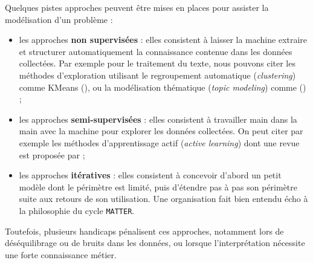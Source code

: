 			\begin{leftBarIdea}
				Quelques pistes approches peuvent être mises en places pour assister la modélisation d'un problème :
				\begin{itemize}
					\item les approches \textbf{non supervisées} :
					elles consistent à laisser la machine extraire et structurer automatiquement la connaissance contenue dans les données collectées.
					Par exemple pour le traitement du texte, nous pouvons citer les méthodes d'exploration utilisant le regroupement automatique (\textit{clustering}) comme KMeans (\cite{macqueen:1967:methods-classification-analysis}), ou la modélisation thématique (\textit{topic modeling}) comme  (\cite{blei-etal:2003:latent-dirichlet-allocation}) ;
					\item les approches \textbf{semi-supervisées} :
					elles consistent à travailler main dans la main avec la machine pour explorer les données collectées.
					On peut citer par exemple les méthodes d'apprentissage actif (\textit{active learning}) dont une revue est proposée par \cite{settles:2010:active-learning-literature} ;
					\item les approches \textbf{itératives} :
					elles consistent à concevoir d’abord un petit modèle dont le périmètre est limité, puis d'étendre pas à pas son périmètre suite aux retours de son utilisation.
					Une organisation fait bien entendu écho à la philosophie du cycle \texttt{MATTER}.
				\end{itemize}
				Toutefois, plusieurs handicaps pénalisent ces approches, notamment lors de déséquilibrage ou de bruits dans les données, ou lorsque l'interprétation nécessite une forte connaissance métier.
			\end{leftBarIdea}
			
